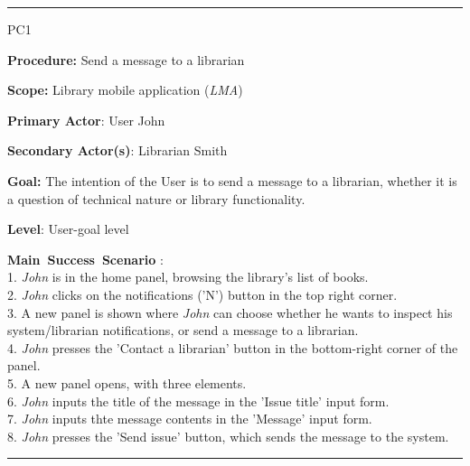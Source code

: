 
\vspace{0.5cm}
\hrule
\begin{lyxlist}{PC1}
\small{
\item [\textbf{Procedure:}] Send a message to a librarian
\item [\textbf{Scope:}] Library mobile application (\emph{LMA})
\item [\textbf{Primary Actor}:] User John
\item [\textbf{Secondary Actor(s)}:] Librarian Smith
\item [\textbf{Goal:}] The intention of the User is to send a message to a
librarian, whether it is a question of technical nature or library
functionality.
\item [\textbf{Level}:] User-goal level
\item [\textbf{Main~Success~Scenario}]:\\
1. \emph{John} is in the home panel, browsing the library's list of books. \\
2. \emph{John} clicks on the notifications ('N') button in the top right corner.
\\
3. A new panel is shown where \emph{John} can choose whether he wants to
inspect his system/librarian notifications, or send a message to a librarian. \\
4. \emph{John} presses the 'Contact a librarian' button in the bottom-right
corner of the panel.
\\
5. A new panel opens, with three elements. \\
6. \emph{John} inputs the title of the message in the 'Issue title' input form.
\\
7. \emph{John} inputs thte message contents in the 'Message' input form. \\
8. \emph{John} presses the 'Send issue' button, which sends the message to the
system. \\

}

\end{lyxlist}
\hrule

